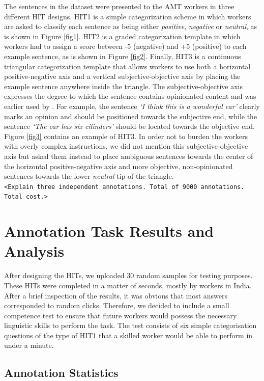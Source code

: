 \documentclass[11pt,letterpaper]{article}
\begin{document}
The sentences in the dataset were presented to the AMT workers in three different HIT designs. HIT1 is a simple categorization scheme in which workers are asked to classify each sentence as being either \textit{positive}, \textit{negative} or \textit{neutral}, as is shown in Figure \ref{fig1}. HIT2 is a graded categorization template in which workers had to assign a score between -5 (negative) and +5 (positive) to each example sentence, as is shown in Figure \ref{fig2}. Finally, HIT3 is a continuous triangular categorization template that allows workers to use both a horizontal positive-negative axis and a vertical subjective-objective axis by placing the example sentence anywhere inside the triangle. The subjective-objective axis expresses the degree to which the sentence contains opinionated content and was earlier used by \cite{sentiwordnet:06}. For example, the sentence \textit{`I think this is a wonderful car'} clearly marks an opinion and should be positioned towards the subjective end, while the sentence \textit{`The car has six cilinders'} should be located towards the objective end. Figure \ref{fig3} contains an example of HIT3. In order not to burden the workers with overly complex instructions, we did not mention this subjective-objective axis but asked them instead to place ambiguous sentences towards the center of the horizontal positive-negative axis and more objective, non-opinionated sentences towards the lower \textit{neutral} tip of the triangle.\\

\texttt{<Explain three independent annotations. Total of 9000 annotations. Total cost.>}

\section{Annotation Task Results and Analysis}
\label{sect:results}

After designing the HITs, we uploaded 30 random samples for testing purposes. These HITs were completed in a matter of seconds, mostly by workers in India. After a brief inspection of the results, it was obvious that most answers corresponded to random clicks. Therefore, we decided to include a small competence test to ensure that future workers would possess the necessary linguistic skills to perform the task. The test consists of six simple categorisation questions of the type of HIT1 that a skilled worker would be able to perform in under a minute.

\subsection{Annotation Statistics}
\end{document}
